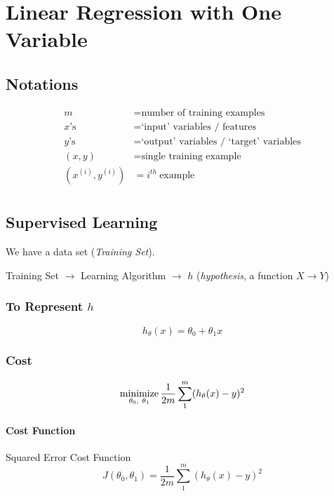 \chapter{Linear Regression with One Variable}

\section{Notations}
\begin{align*}
    m                  & = \text{number of training examples}             \\
    x\text{'s}         & = \text{`input' variables / features}            \\
    y\text{'s}         & = \text{`output' variables / `target' variables} \\
    (x, y)             & = \text{single training example}                 \\
    (x^{(i)}, y^{(i)}) & = i^{th} \  \text{example}                       \\
\end{align*}

\section{Supervised Learning}
We have a data set (\emph{Training Set}).

Training Set $\rightarrow$ Learning Algorithm $\rightarrow$ $h$ (\emph{hypothesis},
a function $X \to Y$)

\subsection*{To Represent \texorpdfstring{$h$}{}}
\begin{equation*}
    h_\theta(x) = \theta_0 + \theta_1x
\end{equation*}

\subsection*{Cost}
\begin{equation*}
    \operatorname*{minimize}_{\theta_0,\ \theta_1} \frac{1}{2m}\sum_1^m(h_\theta(x) - y)^2
\end{equation*}
\subsubsection*{Cost Function}
Squared Error Cost Function
\begin{equation*}
    J(\theta_0, \theta_1) = \frac{1}{2m}\sum_1^m(h_\theta(x) - y)^2
\end{equation*}
